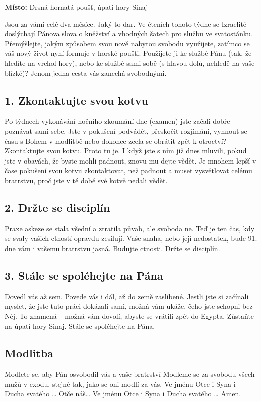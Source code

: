 \documentclass[11pt]{article}
\begin{document}
\textbf{Místo:} Drsná hornatá poušť, úpatí hory Sinaj

Jsou za vámi celé dva měsíce. Jaký to dar. Ve čteních tohoto týdne se Izraelité doslýchají Pánova slova o
kněžství a vhodných šatech pro službu ve svatostánku. Přemýšlejte, jakým způsobem svou nově nabytou
svobodu využijete, zatímco se váš nový život nyní formuje v horské poušti. Použijete ji ke službě Pánu (tak, že
hledíte na vrchol hory), nebo ke službě sami sobě (s hlavou dolů, nehledě na vaše blízké)? Jenom jedna cesta
vás zanechá svobodnými.

\subsection*{1. Zkontaktujte svou kotvu}
Po týdnech vykonávání nočního zkoumání dne (examen) jste začali dobře poznávat sami sebe. Jste v pokušení podvádět, přeskočit rozjímání, vyhnout se času s Bohem v modlitbě nebo dokonce zcela se obrátit zpět k otroctví? Zkontaktujte svou kotvu. Proto tu je. I když jste s ním již dnes mluvili, pokud jste v obavách, že byste mohli padnout, znovu mu dejte vědět. Je mnohem lepší v čase pokušení svou kotvu zkontaktovat, než padnout a muset vysvětlovat celému bratrstvu, proč jste v té době své kotvě nedali vědět.
\subsection*{2. Držte se disciplín}
Praxe askeze se stala všední a ztratila půvab, ale svoboda ne. Teď je ten čas, kdy se svaly vašich ctností opravdu zesilují. Vaše snaha, nebo její nedostatek, bude 91. dne vám i vašemu bratrstvu jasná. Budujte ctnosti. Držte se disciplín.
\subsection*{3. Stále se spoléhejte na Pána}
Dovedl vás až sem. Povede vás i dál, až do země zaslíbené. Jestli jste si začínali myslet, že jste tuto práci dokázali sami, možná vám ukáže, čeho jste schopni bez Něj. To znamená – možná vám dovolí, abyste se vrátili zpět do Egypta. Zůstaňte na úpatí hory Sinaj. Stále se spoléhejte na Pána.
\subsection*{Modlitba}
Modlete se, aby Pán osvobodil vás a vaše bratrství \newline
Modleme se za svobodu všech mužů v exodu, stejně tak, jako se oni modlí za vás.\newline
Ve jménu Otce i Syna i Ducha svatého … Otče náš… Ve jménu Otce i Syna i Ducha svatého … Amen.
\newpage
\end{document}
